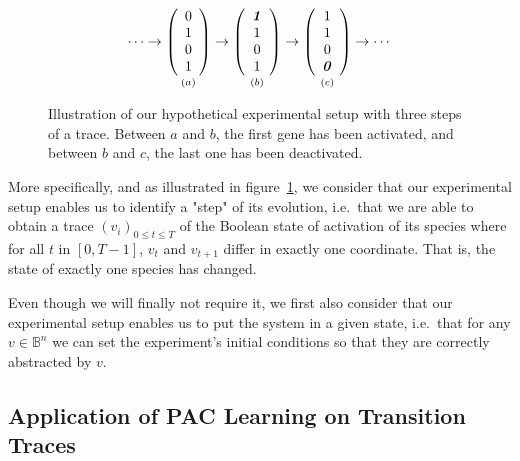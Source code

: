 \documentclass{llncs}
\begin{document}
\begin{figure}[htbp]
	{\large 
	\[
	\cdots
	\rightarrow
	\underset{\vspace{1em}(a)}{
		\left(\begin{array}{c}
		0\\ 1\\ 0\\ 1
		\end{array}\right)}
	\rightarrow
	\underset{\vspace{1em}(b)}{
		\left(\begin{array}{c}
		\textbf{\textit{1}}\\ 1\\ 0\\ 1
		\end{array}\right)}
	\rightarrow
	\underset{\vspace{1em}(c)}{
		\left(\begin{array}{c}
		1\\ 1\\ 0\\ \textbf{\textit 0}
		\end{array}\right)}
	\rightarrow
	\cdots
	\]
}
	\caption{\label{steps}Illustration of our hypothetical experimental setup with three steps of a trace. Between $a$ and $b$, the first gene has been activated, and between $b$ and $c$, the last one has been deactivated.}
\end{figure}

More specifically, and as illustrated in figure~\ref{steps}, we consider that our experimental setup enables us to identify a "step" of its evolution, i.e.~that we are able to obtain a trace $(v_i)_{0 \leq t \leq T}$ of the Boolean state of activation of its species where for all $t$ in $[0,T-1]$, $v_t$ and $v_{t+1}$ differ in exactly one coordinate. That is, the state of exactly one species has changed.


Even though we will finally not require it, we first also consider that our experimental setup enables us to put the system in a given state, i.e.~that for any $v \in \mathbb{B}^n$ we can set the experiment's initial conditions so that they are correctly abstracted by $v$.

\subsection{Application of PAC Learning on Transition Traces}
\end{document}
